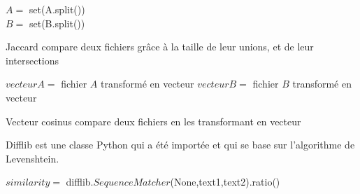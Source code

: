 \documentclass[french,12pt]{article}
\begin{document}
\begin{algorithm}[H]
\DontPrintSemicolon
{}
$A =$ set(A.split())\\
$B =$ set(B.split())\\
\caption{{\sc Jaccard} compare deux fichiers grâce à la taille de leur unions, et de leur intersections}
\end{algorithm}

\quad

\begin{algorithm}[H]
\DontPrintSemicolon
{}
$vecteurA =$ fichier $A$ transformé en vecteur\;
$vecteurB =$ fichier $B$ transformé en vecteur\;
\caption{{\sc Vecteur cosinus} compare deux fichiers en les transformant en vecteur}
\end{algorithm}


\begin{algorithm}[H]
    \caption{{\sc Difflib} est une classe Python qui a été importée  et qui se base sur l'algorithme de Levenshtein.}
    $similarity =$ difflib.$SequenceMatcher$(None,text1,text2).ratio()
\end{algorithm}
\end{document}
